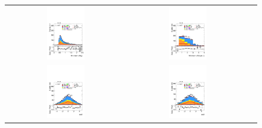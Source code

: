 \begin{figure}[htbp]
\begin{tabular}{@{}c c c@{}}
    \includegraphics[width=0.33\textwidth]{images/plots_modelling_run2_run3_variables/run_2_tth/plot_jjdrmin_hh_tth_15_16_17_18.pdf} &
    \includegraphics[width=0.33\textwidth]{images/plots_modelling_run2_run3_variables/run_2_tth/plot_min_dr_btau_hh_tth_15_16_17_18.pdf}\\[4pt]
    \includegraphics[width=0.33\textwidth]{images/plots_modelling_run2_run3_variables/run_2_tth/plot_eta2_hh_tth_15_16_17_18.pdf} &
    \includegraphics[width=0.33\textwidth]{images/plots_modelling_run2_run3_variables/run_2_tth/plot_eta3_hh_tth_15_16_17_18.pdf} &

\end{tabular}
\end{figure}
